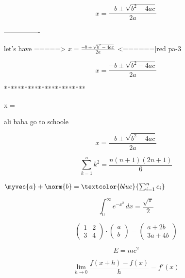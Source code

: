 
$$
x = \frac{-b \pm \sqrt{b^2 - 4ac}}{2a} $$  

----------------

let's have =====> $x = \frac{-b \pm \sqrt{b^2 - 4ac}}{2a}$ <======|red pa-3

$$
x = \frac{-b \pm \sqrt{b^2 - 4ac}}{2a}
$$


************************

x = 

ali baba go to schoole

$$
x = \frac{-b \pm \sqrt{b^2 - 4ac}}{2a}
$$

$$
\sum_{k=1}^n k^2 = \frac{n(n+1)(2n+1)}{6}
$$

$\myvec{a} + \norm{b} = \textcolor{blue}{\sum_{i=1}^n c_i}$

$$
\int_0^\infty e^{-x^2}\,dx = \frac{\sqrt{\pi}}{2}
$$

$$
\begin{pmatrix}
1 & 2 \\
3 & 4
\end{pmatrix}
\cdot
\begin{pmatrix}
a \\ b
\end{pmatrix}
=
\begin{pmatrix}
a+2b \\ 3a+4b
\end{pmatrix}
$$

$$
E = mc^2 \tag{1.1}
$$

$$
\lim_{h \to 0} \frac{f(x+h) - f(x)}{h} = f'(x)
$$

